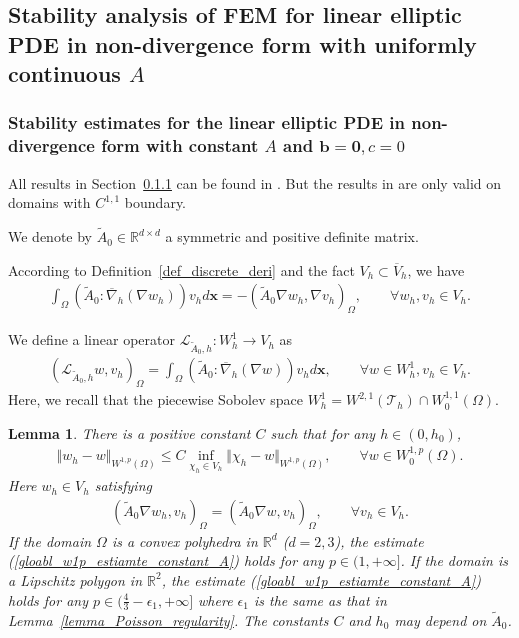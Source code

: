 \documentclass[12pt]{amsart}
\newcommand{\boldx}{\boldsymbol{x}}
\newtheorem{lemma}{Lemma}[section]
\theoremstyle{definition}
\theoremstyle{remark}
\begin{document}
\subsection{Stability analysis of FEM for linear elliptic PDE in non-divergence form with uniformly continuous $A$}


\subsubsection{Stability estimates for the linear elliptic PDE in non-divergence form 
with constant $A$ and $\boldsymbol{b}=\boldsymbol{0}, c = 0$}
\label{sec_stability_constant_A} 

All results in Section~\ref{sec_stability_constant_A} can be found in \cite{FHM2017}. 
But the results in \cite{FHM2017} are only valid on domains with $C^{1,1}$ boundary. 

We denote by $\tilde{A}_{0} \in \mathbb{R}^{d\times d}$ a symmetric and positive definite matrix.

According to Definition~\ref{def_discrete_deri} and the fact $V_{h} \subset \overline{V}_{h}$, we have
\begin{align}
\label{nondiv_fem_constant_A}
\int_{\Omega}(\tilde{A}_{0}: \overline{\nabla}_{h}(\nabla w_{h}))v_{h} d\boldx 
= -(\tilde{A}_{0}\nabla w_{h}, \nabla v_{h})_{\Omega}, \qquad \forall w_{h},v_{h}\in V_{h}.
\end{align}

We define a linear operator $\mathcal{L}_{\tilde{A}_{0},h}: W_{h}^{1} \rightarrow V_{h}$ as 
\begin{align}
\label{def_L_A_constant_numerical}
(\mathcal{L}_{\tilde{A}_{0},h}w, v_{h})_{\Omega} = \int_{\Omega}(\tilde{A}_{0}: \overline{\nabla}_{h}(\nabla w))v_{h} d\boldx,  
\qquad \forall w \in W_{h}^{1}, v_{h} \in V_{h}.
\end{align}
Here, we recall that the piecewise Sobolev space $W_{h}^{1} =W^{2,1}(\mathcal{T}_{h}) \cap W_{0}^{1,1}(\Omega)$.

\begin{lemma}
\label{lem_w1p_estimate}
There is a positive constant $C$ such that for any $h \in (0, h_{0})$,
\begin{align}
\label{gloabl_w1p_estiamte_constant_A}
\Vert w_{h} - w\Vert_{W^{1,p}(\Omega)}\leq C 
\inf_{\chi_{h} \in V_{h}}\Vert \chi_{h} - w\Vert_{W^{1,p}(\Omega)}, 
\qquad \forall w \in W_{0}^{1,p}(\Omega).
\end{align}
Here $w_{h} \in V_{h}$ satisfying 
\begin{align*}
(\tilde{A}_{0} \nabla w_{h}, v_{h})_{\Omega} = 
(\tilde{A}_{0} \nabla w, v_{h})_{\Omega}, 
\qquad \forall v_{h} \in V_{h}.
\end{align*}
If the domain $\Omega$ is a convex polyhedra in $\mathbb{R}^{d}$ ($d=2,3$), the estimate (\ref{gloabl_w1p_estiamte_constant_A}) 
holds for any $p \in (1,+\infty]$. If the domain is a Lipschitz polygon in 
$\mathbb{R}^{2}$, the estimate 
(\ref{gloabl_w1p_estiamte_constant_A}) holds for any $p \in (\frac{4}{3} - \epsilon_{1}, +\infty]$ where $\epsilon_{1}$ 
is the same as that in Lemma~\ref{lemma_Poisson_regularity}. 
The constants $C$ and $h_{0}$ may depend on $\tilde{A}_{0}$.
\end{lemma}
\end{document}
